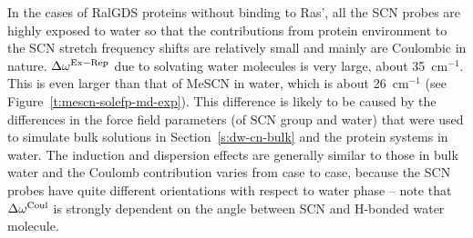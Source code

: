 \documentclass[b5paper,oneside,fleqn,11pt]{book}
\begin{document}
\begin{refsection}
In the cases of RalGDS proteins without binding to Ras',
all the SCN probes are highly exposed to water so
that the contributions from protein environment to the SCN
stretch frequency shifts are relatively small and mainly are
Coulombic in nature. $\Delta\omega^{\rm Ex-Rep}$ due to solvating water molecules
is very large, about 35~cm$^{-1}$. This is even larger than that of
MeSCN in water, which is about 26~cm$^{-1}$ (see Figure~\ref{t:mescn-solefp-md-exp}).
This difference is likely to be caused by the differences in
the force field parameters (of SCN group and water) that were
used to simulate bulk solutions in Section~\ref{s:dw-cn-bulk} and the protein
systems in water. The induction and dispersion effects are
generally similar to those in bulk water and the Coulomb
contribution varies from case to case, because the SCN probes
have quite different orientations with respect to water phase --
note that $\Delta\omega^{\rm Coul}$ is strongly dependent on the angle between
SCN and H-bonded water molecule.


\end{refsection}
\end{document}
